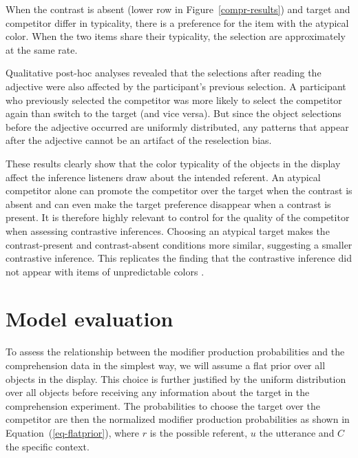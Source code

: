 \documentclass[10pt,letterpaper]{article}
\newcommand{\ek}[1]{\textcolor{Orange}{[ek: #1]}}
\begin{document}
When the contrast is absent (lower row in Figure~\ref{compr-results}) and target and competitor differ in typicality, there is a preference for the item with the atypical color. When the two items share their typicality, the selection are approximately at the same rate. 


Qualitative post-hoc analyses revealed that the selections after reading the adjective were also affected by the participant's previous selection. A participant who previously selected the competitor was more likely to select the competitor again than switch to the target (and vice versa). But since the object selections before the adjective occurred are uniformly distributed, any patterns that appear after the adjective cannot be an artifact of the reselection bias.

These results clearly show that the color typicality of the objects in the display affect the inference listeners draw about the intended referent. An atypical competitor alone can promote the competitor over the target when the contrast is absent and can even make the target preference disappear when a contrast is present. It is therefore highly relevant to control for the quality of the competitor when assessing contrastive inferences. 
Choosing an atypical target makes the contrast-present and contrast-absent conditions more similar, suggesting a smaller contrastive inference. This replicates the finding that the contrastive inference did not appear with items of unpredictable colors \cite{Sedivy:2003}.

\section{Model evaluation}

To assess the relationship between the modifier production probabilities and the comprehension data in the simplest way, we will assume a flat prior over all objects in the display. This choice is further justified by the uniform distribution over all objects before receiving any information about the target in the comprehension experiment. The probabilities to choose the target over the competitor are then the normalized modifier production probabilities as shown in Equation~(\ref{eq-flatprior}), where $r$ is the possible referent, $u$ the utterance and $C$ the specific context.
\end{document}

